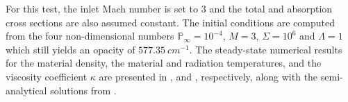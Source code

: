 \documentclass[times,doublespace]{fldauth}%
\begin{document}
%
For this test, the inlet Mach number is set to $3$ and the total and absorption cross sections are also assumed constant. The initial conditions are computed from the four non-dimensional numbers $\mathbb{P}_\infty=10^{-4}$, $M=3$, $\mathbb{\Sigma}=10^6$ and $\mathbb{\Lambda}=1$ which still yields an opacity of $577.35 \ cm^{-1}$. The steady-state numerical results for the material density, the material and radiation temperatures, and the viscosity coefficient $\kappa$ are presented in ,  and , respectively, along with the semi-analytical solutions from \cite{ferguson}.
\end{document}
